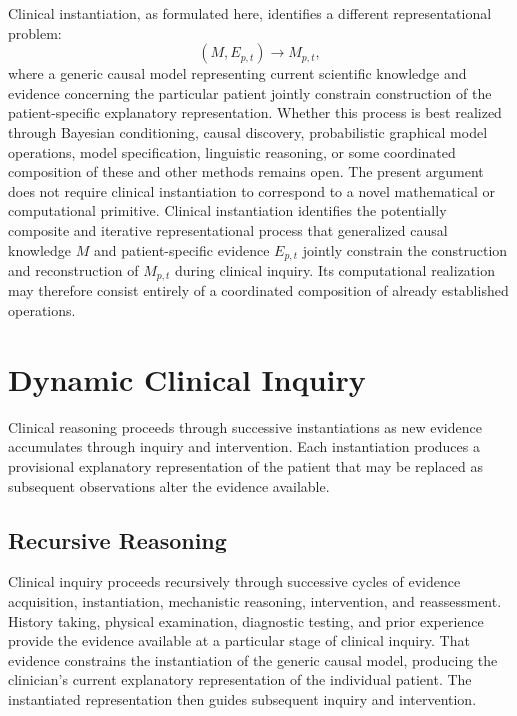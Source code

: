 \documentclass[11pt]{article}
\begin{document}
Clinical instantiation, as formulated here, identifies a different representational problem:
\[
(M,E_{p,t}) \longrightarrow M_{p,t},
\]
where a generic causal model representing current scientific knowledge and evidence concerning the particular patient jointly constrain construction of the patient-specific explanatory representation. Whether this process is best realized through Bayesian conditioning, causal discovery, probabilistic graphical model operations, model specification, linguistic reasoning, or some coordinated composition of these and other methods remains open. The present argument does not require clinical instantiation to correspond to a novel mathematical or computational primitive. Clinical instantiation identifies the potentially composite and iterative representational process that generalized causal knowledge $M$ and patient-specific evidence $E_{p,t}$ jointly constrain the construction and reconstruction of $M_{p,t}$ during clinical inquiry. Its computational realization may therefore consist entirely of a coordinated composition of already established operations.

\section{Dynamic Clinical Inquiry}

Clinical reasoning proceeds through successive instantiations as new evidence accumulates through inquiry and intervention. Each instantiation produces a provisional explanatory representation of the patient that may be replaced as subsequent observations alter the evidence available.

\subsection{Recursive Reasoning}

Clinical inquiry proceeds recursively through successive cycles of evidence acquisition, instantiation, mechanistic reasoning, intervention, and reassessment. History taking, physical examination, diagnostic testing, and prior experience provide the evidence available at a particular stage of clinical inquiry. That evidence constrains the instantiation of the generic causal model, producing the clinician's current explanatory representation of the individual patient. The instantiated representation then guides subsequent inquiry and intervention.
\end{document}
